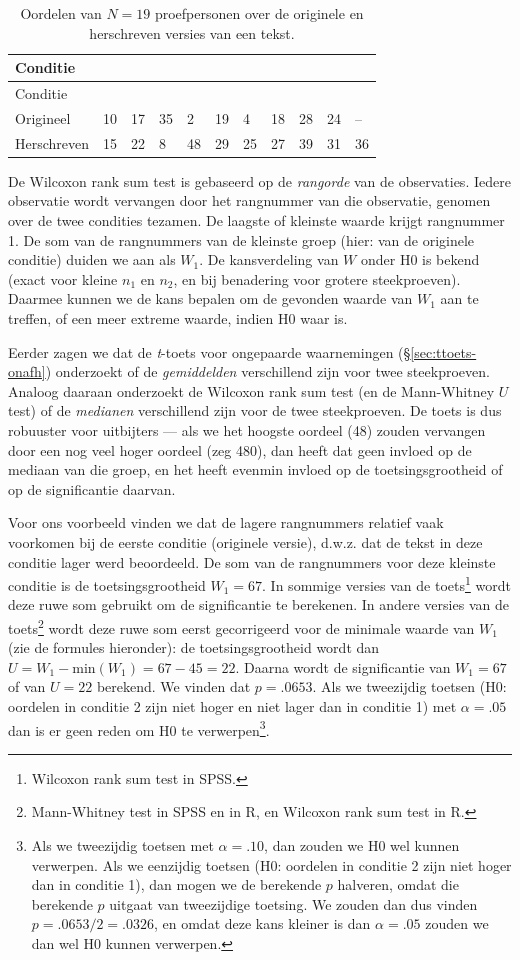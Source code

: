 \documentclass[
]{book}
\begin{document}
\begin{longtable}[]{@{}lllllllllll@{}}
\caption{\label{tab:data-origineelherschreven} Oordelen van \(N=19\) proefpersonen over de originele en herschreven versies van een tekst.}\tabularnewline
\toprule
Conditie & & & & & & & & & &\tabularnewline
\midrule
\endfirsthead
\toprule
Conditie & & & & & & & & & &\tabularnewline
\midrule
\endhead
Origineel & 10 & 17 & 35 & 2 & 19 & 4 & 18 & 28 & 24 & --\tabularnewline
Herschreven & 15 & 22 & 8 & 48 & 29 & 25 & 27 & 39 & 31 & 36\tabularnewline
\bottomrule
\end{longtable}

De Wilcoxon rank sum test is gebaseerd op de \emph{rangorde} van de
observaties. Iedere observatie wordt vervangen door het rangnummer van
die observatie, genomen over de twee condities tezamen. De laagste of
kleinste waarde krijgt rangnummer 1. De som van de rangnummers van de
kleinste groep (hier: van de originele conditie) duiden we aan als
\(W_1\). De kansverdeling van \(W\) onder H0 is bekend (exact voor kleine
\(n_1\) en \(n_2\), en bij benadering voor grotere steekproeven). Daarmee
kunnen we de kans bepalen om de gevonden waarde van \(W_1\) aan te
treffen, of een meer extreme waarde, indien H0 waar is.

Eerder zagen we dat de \emph{t}-toets voor ongepaarde waarnemingen
(§\ref{sec:ttoets-onafh}) onderzoekt of de \emph{gemiddelden}
verschillend zijn voor twee steekproeven. Analoog daaraan onderzoekt de
Wilcoxon rank sum test (en de Mann-Whitney \(U\) test) of de \emph{medianen}
verschillend zijn voor de twee steekproeven. De toets is dus robuuster
voor uitbijters --- als we het hoogste oordeel (48) zouden vervangen
door een nog veel hoger oordeel (zeg 480), dan heeft dat geen invloed op
de mediaan van die groep, en het heeft evenmin invloed op de
toetsingsgrootheid of op de significantie daarvan.

Voor ons voorbeeld vinden we dat de lagere rangnummers relatief vaak
voorkomen bij de eerste conditie (originele versie), d.w.z. dat de tekst
in deze conditie lager werd beoordeeld. De som van de rangnummers voor
deze kleinste conditie is de toetsingsgrootheid \(W_1=67\). In sommige
versies van de toets\footnote{Wilcoxon rank sum test in SPSS.} wordt deze ruwe som gebruikt om de
significantie te berekenen. In andere versies van de toets\footnote{Mann-Whitney test in SPSS en in R, en Wilcoxon rank sum test in R.} wordt
deze ruwe som eerst gecorrigeerd voor de minimale waarde van \(W_1\) (zie
de formules hieronder): de toetsingsgrootheid wordt dan
\(U=W_1 - \textrm{min}(W_1) = 67-45=22\). Daarna wordt de significantie
van \(W_1=67\) of van \(U=22\) berekend. We vinden dat \(p=.0653\). Als we
tweezijdig toetsen (H0: oordelen in conditie 2 zijn niet hoger en niet
lager dan in conditie 1) met \(\alpha=.05\) dan is er geen reden om H0 te
verwerpen\footnote{Als we tweezijdig toetsen met \(\alpha=.10\), dan zouden we H0 wel kunnen verwerpen. Als we eenzijdig toetsen (H0: oordelen in conditie 2 zijn niet hoger dan in conditie 1), dan mogen we de berekende \(p\) halveren, omdat die berekende \(p\) uitgaat van tweezijdige toetsing. We zouden dan dus vinden \(p=.0653/2=.0326\), en omdat deze kans kleiner is dan \(\alpha=.05\) zouden we dan wel H0 kunnen verwerpen.}.
\end{document}
